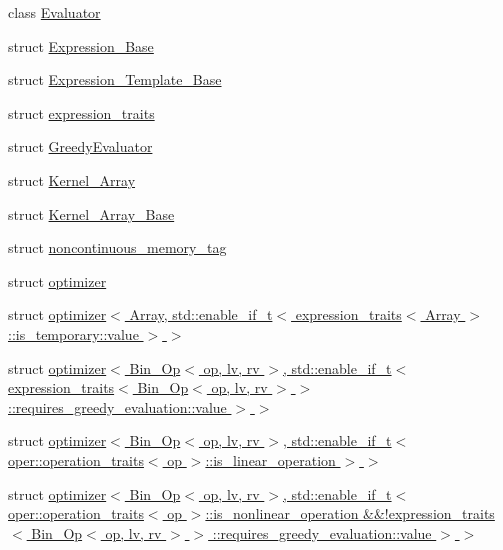 \begin{DoxyCompactItemize}
\item 
class \hyperlink{classbc_1_1tensors_1_1exprs_1_1Evaluator}{Evaluator}
\item 
struct \hyperlink{structbc_1_1tensors_1_1exprs_1_1Expression__Base}{Expression\+\_\+\+Base}
\item 
struct \hyperlink{structbc_1_1tensors_1_1exprs_1_1Expression__Template__Base}{Expression\+\_\+\+Template\+\_\+\+Base}
\item 
struct \hyperlink{structbc_1_1tensors_1_1exprs_1_1expression__traits}{expression\+\_\+traits}
\item 
struct \hyperlink{structbc_1_1tensors_1_1exprs_1_1GreedyEvaluator}{Greedy\+Evaluator}
\item 
struct \hyperlink{structbc_1_1tensors_1_1exprs_1_1Kernel__Array}{Kernel\+\_\+\+Array}
\item 
struct \hyperlink{structbc_1_1tensors_1_1exprs_1_1Kernel__Array__Base}{Kernel\+\_\+\+Array\+\_\+\+Base}
\item 
struct \hyperlink{structbc_1_1tensors_1_1exprs_1_1noncontinuous__memory__tag}{noncontinuous\+\_\+memory\+\_\+tag}
\item 
struct \hyperlink{structbc_1_1tensors_1_1exprs_1_1optimizer}{optimizer}
\item 
struct \hyperlink{structbc_1_1tensors_1_1exprs_1_1optimizer_3_01Array_00_01std_1_1enable__if__t_3_01expression__tr6f024f979d44d7dd29d94a5b5f9e889b}{optimizer$<$ Array, std\+::enable\+\_\+if\+\_\+t$<$ expression\+\_\+traits$<$ Array $>$\+::is\+\_\+temporary\+::value $>$ $>$}
\item 
struct \hyperlink{structbc_1_1tensors_1_1exprs_1_1optimizer_3_01Bin__Op_3_01op_00_01lv_00_01rv_01_4_00_01std_1_1en9f7937e0476e741d2784c5c0f63b3f8d}{optimizer$<$ Bin\+\_\+\+Op$<$ op, lv, rv $>$, std\+::enable\+\_\+if\+\_\+t$<$ expression\+\_\+traits$<$ Bin\+\_\+\+Op$<$ op, lv, rv $>$ $>$ \+::requires\+\_\+greedy\+\_\+evaluation\+::value $>$ $>$}
\item 
struct \hyperlink{structbc_1_1tensors_1_1exprs_1_1optimizer_3_01Bin__Op_3_01op_00_01lv_00_01rv_01_4_00_01std_1_1en0dcf27d7e2238f62469eab81d847c552}{optimizer$<$ Bin\+\_\+\+Op$<$ op, lv, rv $>$, std\+::enable\+\_\+if\+\_\+t$<$ oper\+::operation\+\_\+traits$<$ op $>$\+::is\+\_\+linear\+\_\+operation $>$ $>$}
\item 
struct \hyperlink{structbc_1_1tensors_1_1exprs_1_1optimizer_3_01Bin__Op_3_01op_00_01lv_00_01rv_01_4_00_01std_1_1enfb9b185ed6056cdbdfe04ef149dd3f73}{optimizer$<$ Bin\+\_\+\+Op$<$ op, lv, rv $>$, std\+::enable\+\_\+if\+\_\+t$<$ oper\+::operation\+\_\+traits$<$ op $>$\+::is\+\_\+nonlinear\+\_\+operation \&\&!expression\+\_\+traits$<$ Bin\+\_\+\+Op$<$ op, lv, rv $>$ $>$ \+::requires\+\_\+greedy\+\_\+evaluation\+::value $>$ $>$}

\end{DoxyCompactItemize}

